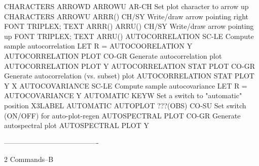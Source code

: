                                   CHARACTERS ARROWD
ARROWU                      AR-CH Set plot character to arrow up
                                  CHARACTERS ARROWU
ARRR()                      CH/SY Write/draw arrow pointing right
                                  FONT TRIPLEX; TEXT ARRR()
ARRU()                      CH/SY Write/draw arrow pointing up
                                  FONT TRIPLEX; TEXT ARRU()
AUTOCORRELATION             SC-LE Compute sample autocorrelation
                                  LET R = AUTOCOORELATION Y
AUTOCORRELATION PLOT        CO-GR Generate autocorrelation plot
                                  AUTOCORRELATION PLOT Y
AUTOCORRELATION STAT PLOT   CO-GR Generate autocorrelation (vs. subset) plot
                                  AUTOCORRELATION STAT PLOT Y X
AUTOCOVARIANCE              SC-LE Compute sample autocovariance
                                  LET R = AUTOCOVARIANCE Y
AUTOMATIC                   KEYW  Set a switch to "automatic" position
                                  X3LABEL AUTOMATIC
AUTOPLOT ???(OBS)           CO-SU Set switch (ON/OFF) for auto-plot-regen
AUTOSPECTRAL PLOT           CO-GR Generate autospectral plot
                                  AUTOSPECTRAL PLOT Y
 
----------------------------------------
 
2
Commands--B
 
